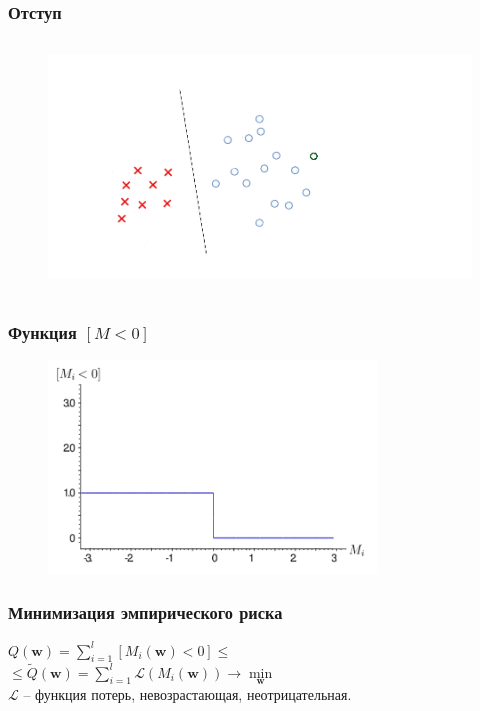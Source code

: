 \documentclass[12pt]{beamer}
\begin{document}
\begin{frame}\frametitle{Отступ}
\begin{figure}[htbp]
  \includegraphics[height=190pt, keepaspectratio = true]{images/margin2}   
\end{figure}
\end{frame}


\begin{frame}\frametitle{Функция $[M<0]$}
\begin{figure}[htbp]
  \includegraphics[height=160pt, keepaspectratio = true]{images/l1}   
\end{figure}
\end{frame}


\begin{frame}\frametitle{Минимизация эмпирического риска}
${Q(\mathbf{w}) = \sum\limits_{i=1}^l \left[ M_i(\mathbf{w}) < 0 \right] \leq}$\\ \vspace{3mm}
${\leq \widetilde{Q}(\mathbf{w}) = \sum\limits_{i=1}^l \mathcal{L}(M_i(\mathbf{w})) \rightarrow \min\limits_{\mathbf{w}} }$\\\vspace{3mm}
$\mathcal{L}$ -- функция потерь, невозрастающая, неотрицательная.\\ 
\end{frame}
\end{document}
